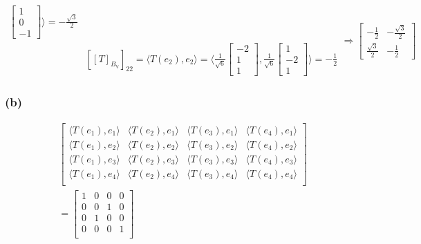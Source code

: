 \documentclass{article}
\begin{document}
\begin{equation*}
\begin{split}
\begin{bmatrix}
            1 \\ 0 \\ -1
        \end{bmatrix} \rangle = - \frac{\sqrt{3}}{2}\\
        &[[T]_{B_\mathbb{V}}]_{22} = \langle T(e_2), e_2 \rangle =  \langle \frac{1}{\sqrt{6}} \begin{bmatrix}
            -2 \\ 1 \\ 1
        \end{bmatrix}, \frac{1}{\sqrt{6}}\begin{bmatrix}
            1 \\ -2 \\ 1
        \end{bmatrix} \rangle = - \frac{1}{2}
    \end{split}
    \Rightarrow \begin{bmatrix}
        - \frac{1}{2} & - \frac{\sqrt{3}}{2}\\ \frac{\sqrt{3}}{2} & - \frac{1}{2}
    \end{bmatrix}
\end{equation*}

\subsubsection*{(b)}
\begin{equation*}
    \begin{split}
        &
        \begin{bmatrix}
            \langle T(e_1), e_1\rangle & \langle T(e_2), e_1\rangle & \langle T(e_3), e_1\rangle & \langle T(e_4), e_1\rangle\\ 
            \langle T(e_1), e_2\rangle & \langle T(e_2), e_2\rangle & \langle T(e_3), e_2\rangle & \langle T(e_4), e_2\rangle\\ 
            \langle T(e_1), e_3\rangle & \langle T(e_2), e_3\rangle & \langle T(e_3), e_3\rangle & \langle T(e_4), e_3\rangle\\ 
            \langle T(e_1), e_4\rangle & \langle T(e_2), e_4\rangle & \langle T(e_3), e_4\rangle & \langle T(e_4), e_4\rangle\\ 
        \end{bmatrix} \\
        & = 
        \begin{bmatrix}
            1 & 0 & 0 & 0 \\
            0 & 0 & 1 & 0 \\
            0 & 1 & 0 & 0 \\
            0 & 0 & 0 & 1 \\
        \end{bmatrix}
    \end{split}
\end{equation*}
\end{document}
